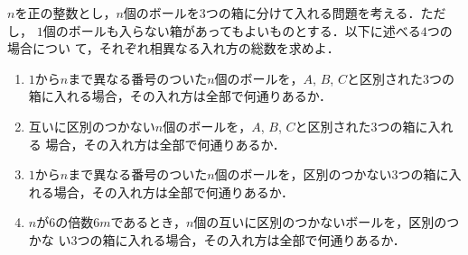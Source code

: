 \documentclass[../../main.tex]{subfiles}
\begin{document}
$n$を正の整数とし，$n$個のボールを$3$つの箱に分けて入れる問題を考える．ただし，
$1$個のボールも入らない箱があってもよいものとする．以下に述べる$4$つの場合につい
て，それぞれ相異なる入れ方の総数を求めよ．

\begin{enumerate}
  \item $1$から$n$まで異なる番号のついた$n$個のボールを，$A$, $B$, $C$と区別された$3$つの
    箱に入れる場合，その入れ方は全部で何通りあるか．

  \item 互いに区別のつかない$n$個のボールを，$A$, $B$, $C$と区別された$3$つの箱に入れる
    場合，その入れ方は全部で何通りあるか．

  \item $1$から$n$まで異なる番号のついた$n$個のボールを，区別のつかない$3$つの箱に入
    れる場合，その入れ方は全部で何通りあるか．

  \item $n$が$6$の倍数$6m$であるとき，$n$個の互いに区別のつかないボールを，区別のつかな
    い$3$つの箱に入れる場合，その入れ方は全部で何通りあるか．
\end{enumerate}
\end{document}
